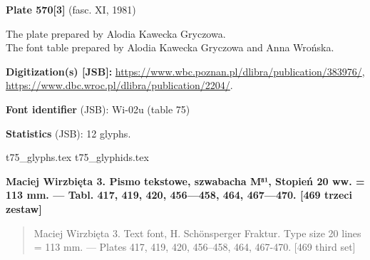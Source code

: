 \documentclass[12pt]{article}
\newcommand{\bg}{\begingl}
\newcommand{\pismoPL}[1]{{\relsize{2}\Junicode\textbf{#1}}}
\newcommand{\pismoEN}[1]{{\relsize{1}\Junicode\begin{quote}#1\end{quote}}}
\newcommand{\plate}[3]{\textbf{Plate #1} (fasc. #2, #3)}
\newcommand{\exampleBib}[1]{{\relsize{2}\Junicode\textbf{The
      example:}\\[2ex] CATALOGUS LIBRORUM \textbf{#1}}}
\newcommand{\exampleDesc}[1]{{\relsize{0}\Junicode#1}}
\newcommand{\exampleDig}[1]{{\relsize{0}\Junicode \textbf{Digitization(s) [JSB]:} #1}}
\newcommand{\exampleLib}[1]{{\relsize{0}\Junicode \textbf{Library:} #1}}
\newcommand{\fontID}[2]{{\relsize{1}\Junicode\textbf{Font identifier} (JSB): #1 (table #2)}}
\newcommand{\fontstat}[1]{{\relsize{1}\Junicode\textbf{Statistics} (JSB): #1 glyphs.}}
\newcommand{\exampleRef}[1]{{\relsize{0}\Junicode \textbf{References:} #1}}
\newcommand{\examplePage}[1]{{Page reference: \relsize{0}\Junicode#1}}
\begin{document}
\plate{570[3]}{XI}{1981}

The plate prepared by Alodia Kawecka Gryczowa.\\
The font table prepared by Alodia Kawecka Gryczowa and Anna Wrońska.

\bigskip


  




  \exampleDig{\url{https://www.wbc.poznan.pl/dlibra/publication/383976/},
    \url{https://www.dbc.wroc.pl/dlibra/publication/2204/}}.

\bigskip

\fontID{Wi-02u}{75}

\fontstat{12}

  {t75_glyphs.tex}
  {t75_glyphids.tex}



 \newpage
 
% 

 


 \pismoPL{Maciej Wirzbięta 3. Pismo tekstowe, szwabacha M⁸¹, Stopień
   20 ww. = 113 mm. — Tabl. 417, 419, 420, 456—458,
   464, 467—470. [469 trzeci zestaw]}
  
 \pismoEN{Maciej Wirzbięta 3. Text font, H. Schönsperger
   Fraktur. Type size 20 lines =  113 mm. — Plates 417, 419, 420, 456--458, 464, 467-470. [469 third set]}
\end{document}

